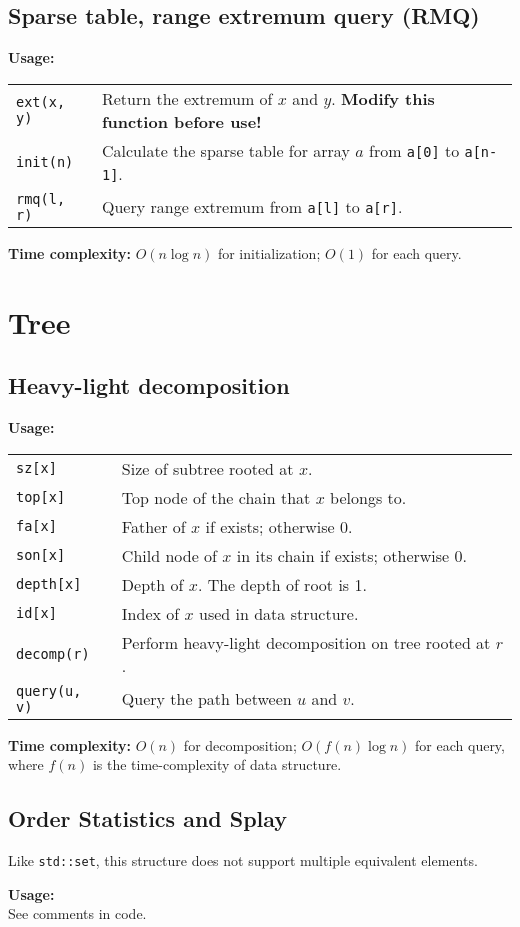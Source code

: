 \subsection{Sparse table, range extremum query (RMQ)}
\textbf{Usage:} \\[0.1cm]
\begin{tabular}{p{2cm} p{9.5cm}}
  \lstinline|ext(x, y)| & Return the extremum of $x$ and $y$. \textbf{Modify this function before use!} \\
  \lstinline|init(n)| & Calculate the sparse table for array $a$ from \lstinline|a[0]| to \lstinline|a[n-1]|. \\
  \lstinline|rmq(l, r)| & Query range extremum from \lstinline|a[l]| to \lstinline|a[r]|. \\
\end{tabular} \par
\textbf{Time complexity:} $O(n \log n)$ for initialization; $O(1)$ for each query. \par


\section{Tree}
\subsection{Heavy-light decomposition}
\textbf{Usage:} \\[0.1cm]
\begin{tabular}{p{2cm} p{9.5cm}}
  \lstinline|sz[x]| & Size of subtree rooted at $x$. \\
  \lstinline|top[x]| & Top node of the chain that $x$ belongs to. \\ \lstinline|fa[x]| & Father of $x$ if exists; otherwise 0. \\
  \lstinline|son[x]| & Child node of $x$ in its chain if exists; otherwise 0. \\
  \lstinline|depth[x]| & Depth of $x$. The depth of root is 1. \\
  \lstinline|id[x]| & Index of $x$ used in data structure. \\
  \lstinline|decomp(r)| & Perform heavy-light decomposition on tree rooted at $r$. \\
  \lstinline|query(u, v)| & Query the path between $u$ and $v$. \\
\end{tabular} \par
\textbf{Time complexity:} $O(n)$ for decomposition; $O(f(n)\log n)$ for each query, where $f(n)$ is the time-complexity of data structure. \par


\subsection{Order Statistics and Splay}
\Warning Like \lstinline|std::set|, this structure does not support multiple equivalent elements. \par
\textbf{Usage:} \\[0.1cm]
See comments in code.



